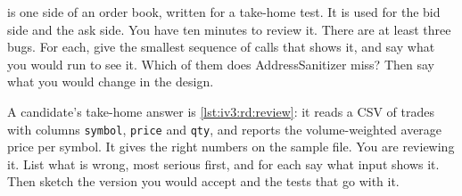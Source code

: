 \begin{question}\label{iq:iv3:reading-debugging-and-software-design:39}
 is one side of an order book, written for a take-home test. It is used for the bid side and the ask side. You have ten minutes to review it. There are at least three bugs. For each, give the smallest sequence of calls that shows it, and say what you would run to see it. Which of them does AddressSanitizer miss? Then say what you would change in the design.
\label{lst:iv3:rd:bookbugs}
\end{question}

\begin{question}\label{iq:iv3:reading-debugging-and-software-design:40}
A candidate's take-home answer is \cref{lst:iv3:rd:review}: it reads a CSV of trades with columns \texttt{symbol}, \texttt{price} and \texttt{qty}, and reports the volume-weighted average price per symbol. It gives the right numbers on the sample file. You are reviewing it. List what is wrong, most serious first, and for each say what input shows it. Then sketch the version you would accept and the tests that go with it.
\label{lst:iv3:rd:review}
\end{question}
